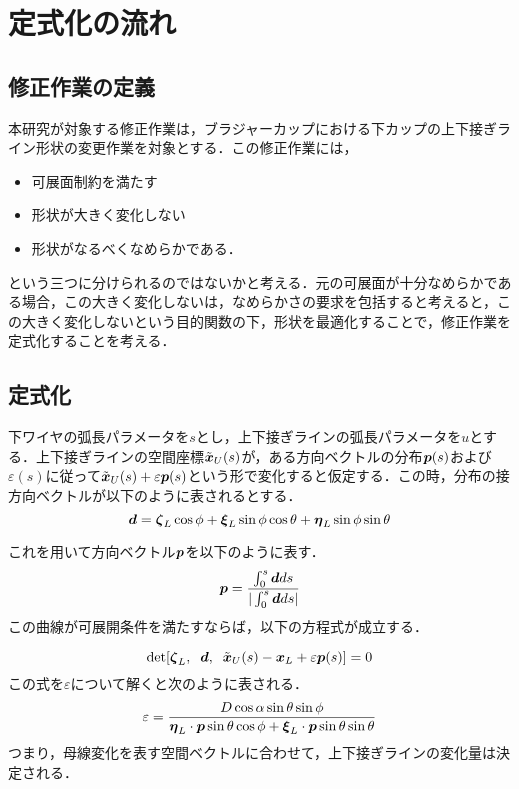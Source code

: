 \newcommand{\STP}[3]{\det[#1,\; #2,\; #3]}

\section{定式化の流れ}
	\subsection{修正作業の定義}
		本研究が対象する修正作業は，ブラジャーカップにおける下カップの上下接ぎライン形状の変更作業を対象とする．この修正作業には，
		\begin{itemize}
			\item 可展面制約を満たす
			\item 形状が大きく変化しない
			\item 形状がなるべくなめらかである．
		\end{itemize}
		という三つに分けられるのではないかと考える．元の可展面が十分なめらかである場合，この大きく変化しないは，なめらかさの要求を包括すると考えると，この大きく変化しないという目的関数の下，形状を最適化することで，修正作業を定式化することを考える．
		
	\subsection{定式化}
		下ワイヤの弧長パラメータを$ s $とし，上下接ぎラインの弧長パラメータを$ u $とする．上下接ぎラインの空間座標$ \tilde{\boldsymbol{x}}_U(s) $が，ある方向ベクトルの分布$ \boldsymbol{p}(s) $および$ \varepsilon(s) $に従って$ \tilde{\boldsymbol{x}}_U(s) + \varepsilon \boldsymbol{p}(s) $という形で変化すると仮定する．この時，分布の接方向ベクトルが以下のように表されるとする．
		\begin{equation}\label{eq:d_eq}
			\boldsymbol{d} = \boldsymbol{\zeta}_L \cos \phi + \boldsymbol{\xi}_L \sin \phi \cos \theta + \boldsymbol{\eta}_L \sin \phi \sin \theta
		\end{equation}
		
		これを用いて方向ベクトル$ \boldsymbol{p} $を以下のように表す．
		\begin{equation}\label{eq:p_eq}
			\boldsymbol{p} = \frac{\int_{0}^{s} \boldsymbol{d} ds}{|\int_{0}^{s} \boldsymbol{d} ds|}
		\end{equation}
		この曲線が可展開条件を満たすならば，以下の方程式が成立する．
		
		\begin{equation}\label{eq:dev_eq}
			\det [\boldsymbol{\zeta}_L,\;\; \boldsymbol{d},\;\; \tilde{\boldsymbol{x}}_U(s) - \boldsymbol{x}_L + \varepsilon \boldsymbol{p}(s) ] = 0
		\end{equation}
		この式を$ \varepsilon $について解くと次のように表される．
		\begin{equation}\label{eq:varep_eq}
			\varepsilon = \frac{D\cos \alpha \sin \theta \sin \phi }{\boldsymbol{\eta}_L \cdot \boldsymbol{p} \sin \theta \cos \phi + \boldsymbol{\xi}_L \cdot \boldsymbol{p} \sin \theta \sin \theta}
		\end{equation}
		つまり，母線変化を表す空間ベクトルに合わせて，上下接ぎラインの変化量は決定される．
		
